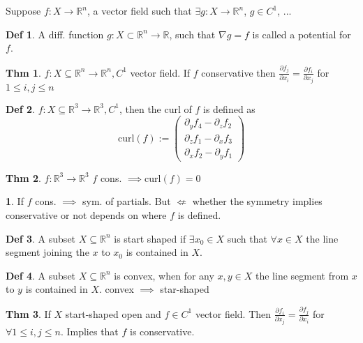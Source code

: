 \documentclass[a4paper, 10pt]{article}
\theoremstyle{definition}
\newtheorem*{theorem}{Thm}
\newtheorem*{definition}{Def}
\theoremstyle{colored}
\newtheorem*{note_wrapper}{}
\theoremstyle{ex}
\theoremstyle{named}
\newenvironment{note}%
    {\begin{mdframed}[style=trick]\begin{note_wrapper}}%
    {\end{note_wrapper}\end{mdframed}}
\newcommand{\R}{\mathbb{R}}
\begin{document}
Suppose \(f: X \to \R^n\), a vector field such that \(\exists g: X \to \R^n\), \(g \in C^1\), ...

\begin{definition}
    A diff. function \(g: X \subset \R^n \to \R\), such that \(\nabla g = f\) is called a potential for \(f\).
\end{definition}

\begin{theorem}
    \(f: X \subseteq \R^n \to \R^n, C^1\) vector field. If \(f\) conservative then \(\frac{\partial f_j}{\partial x_i} = \frac{\partial f_i}{\partial x_j}\) for \(1 \leq i, j \leq n\)
\end{theorem}

\begin{definition}
    \(f: X \subseteq \R^3 \to \R^3, C^1\), then the curl of \(f\) is defined as
    \[\text{curl}(f) := \begin{pmatrix}
        \partial_y f_4 - \partial_z f_2 \\
        \partial_z f_1 - \partial_x f_3 \\
        \partial_x f_2 - \partial_y f_1
    \end{pmatrix}\]
\end{definition}

\begin{theorem}
    \(f: \R^3 \to \R^3\) \(f\) cons. \(\implies \text{curl}(f) = 0\)
\end{theorem}

\begin{note}
    If \(f\) cons. \(\implies\) sym. of partials. But \(\not\Leftarrow\) whether the symmetry implies conservative or not depends on where \(f\) is defined.
\end{note}

\begin{definition}
    A subset \(X \subseteq \R^n\) is start shaped if \(\exists x_0 \in X\) such that \(\forall x \in X\) the line segment joining the \(x\) to \(x_0\) is contained in \(X\).
\end{definition}

\begin{definition}
    A subset \(X \subseteq \R^n\) is convex, when for any \(x, y \in X\) the line segment from \(x\) to \(y\) is contained in \(X\). convex \(\implies\) star-shaped
\end{definition}

\begin{theorem}
    If \(X\) start-shaped open and \(f \in C^1\) vector field. Then \(\frac{\partial f_i}{\partial x_j} = \frac{\partial f_j}{\partial x_i}\) for \(\forall 1 \leq i, j \leq n\). Implies that \(f\) is conservative.
\end{theorem}
\end{document}
